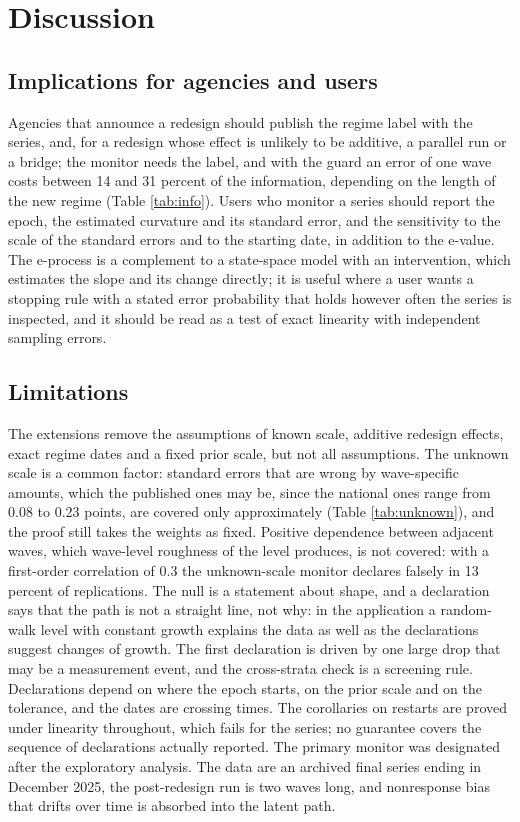 \documentclass[Afour,sageh,times]{sagej}
\theoremstyle{definition}
\begin{document}
\section{Discussion}
\label{sec:discussion}

\subsection{Implications for agencies and users}
\label{sec:implications}

Agencies that announce a redesign should publish the regime label with the series, and, for a redesign whose effect is unlikely to be additive, a parallel run or a bridge; the monitor needs the label, and with the guard an error of one wave costs between 14 and 31 percent of the information, depending on the length of the new regime (Table \ref{tab:info}). Users who monitor a series should report the epoch, the estimated curvature and its standard error, and the sensitivity to the scale of the standard errors and to the starting date, in addition to the e-value. The e-process is a complement to a state-space model with an intervention, which estimates the slope and its change directly; it is useful where a user wants a stopping rule with a stated error probability that holds however often the series is inspected, and it should be read as a test of exact linearity with independent sampling errors.

\subsection{Limitations}
\label{sec:limitations}

The extensions remove the assumptions of known scale, additive redesign effects, exact regime dates and a fixed prior scale, but not all assumptions. The unknown scale is a common factor: standard errors that are wrong by wave-specific amounts, which the published ones may be, since the national ones range from 0.08 to 0.23 points, are covered only approximately (Table \ref{tab:unknown}), and the proof still takes the weights as fixed. Positive dependence between adjacent waves, which wave-level roughness of the level produces, is not covered: with a first-order correlation of 0.3 the unknown-scale monitor declares falsely in 13 percent of replications. The null is a statement about shape, and a declaration says that the path is not a straight line, not why: in the application a random-walk level with constant growth explains the data as well as the declarations suggest changes of growth. The first declaration is driven by one large drop that may be a measurement event, and the cross-strata check is a screening rule. Declarations depend on where the epoch starts, on the prior scale and on the tolerance, and the dates are crossing times. The corollaries on restarts are proved under linearity throughout, which fails for the series; no guarantee covers the sequence of declarations actually reported. The primary monitor was designated after the exploratory analysis. The data are an archived final series ending in December 2025, the post-redesign run is two waves long, and nonresponse bias that drifts over time is absorbed into the latent path.
\end{document}
